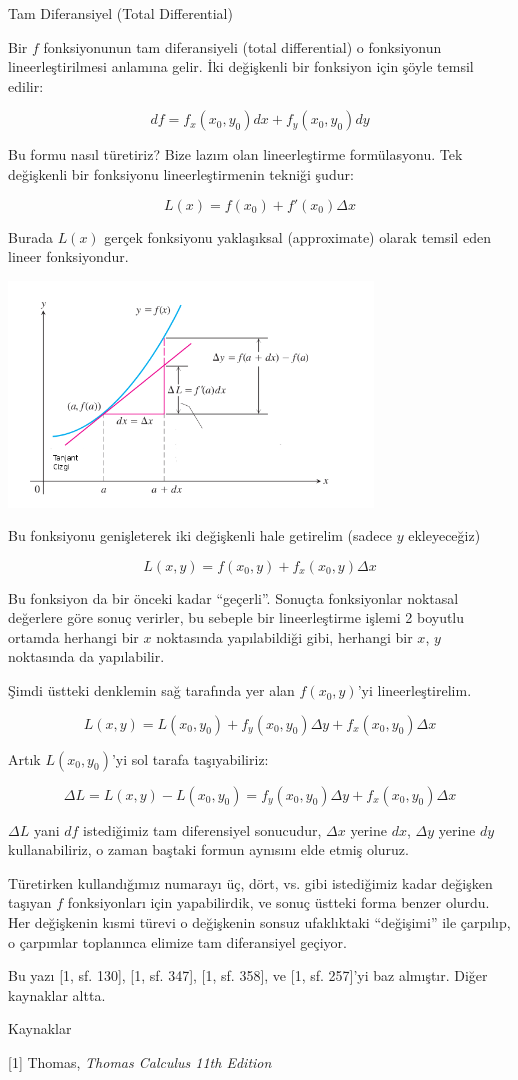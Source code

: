 \documentclass[12pt,fleqn]{article}\usepackage{../../common}
\begin{document}
Tam Diferansiyel (Total Differential)

Bir $f$ fonksiyonunun tam diferansiyeli (total differential) o
fonksiyonun lineerleştirilmesi anlamına gelir. İki değişkenli bir
fonksiyon için şöyle temsil edilir:

$$ df = f_x(x_0, y_0)dx + f_y(x_0,y_0)dy  $$

Bu formu nasıl türetiriz? Bize lazım olan lineerleştirme formülasyonu. Tek
değişkenli bir fonksiyonu lineerleştirmenin tekniği şudur:

$$ L(x) = f(x_0) + f'(x_0) \Delta x  $$

Burada $L(x)$ gerçek fonksiyonu yaklaşıksal (approximate) olarak temsil eden
lineer fonksiyondur. 

\includegraphics[height=6cm]{calc_multi_app_06.png}

Bu fonksiyonu genişleterek iki değişkenli hale getirelim (sadece $y$
ekleyeceğiz)

$$ L(x,y) = f(x_0,y) + f_x(x_0,y) \Delta x $$

Bu fonksiyon da bir önceki kadar ``geçerli''. Sonuçta fonksiyonlar
noktasal değerlere göre sonuç verirler, bu sebeple bir lineerleştirme
işlemi 2 boyutlu ortamda herhangi bir $x$ noktasında yapılabildiği
gibi, herhangi bir $x$, $y$ noktasında da yapılabilir.

Şimdi üstteki denklemin sağ tarafında yer alan $f(x_0,y)$'yi lineerleştirelim.  

$$ L(x,y) = L(x_0,y_0) + f_y(x_0,y_0) \Delta y + f_x(x_0,y_0) \Delta x $$

Artık $L(x_0,y_0)$'yi sol tarafa taşıyabiliriz:

$$ \Delta L = L(x,y) - L(x_0,y_0) = f_y(x_0,y_0) \Delta y + f_x(x_0,y_0)
\Delta x $$ 

$\Delta L$ yani $df$ istediğimiz tam diferensiyel sonucudur, $\Delta
x$ yerine $dx$, $\Delta y$ yerine $dy$ kullanabiliriz, o zaman baştaki
formun aynısını elde etmiş oluruz.

Türetirken kullandığımız numarayı üç, dört, vs. gibi istediğimiz kadar
değişken taşıyan $f$ fonksiyonları için yapabilirdik, ve sonuç üstteki
forma benzer olurdu. Her değişkenin kısmi türevi o değişkenin sonsuz
ufaklıktaki ``değişimi'' ile çarpılıp, o çarpımlar toplanınca elimize
tam diferansiyel geçiyor.

Bu yazı [1, sf. 130], [1, sf. 347], [1, sf. 358], ve [1, sf. 257]'yi baz
almıştır. Diğer kaynaklar altta. 

Kaynaklar

[1] Thomas, {\em Thomas Calculus 11th Edition}
\end{document}
